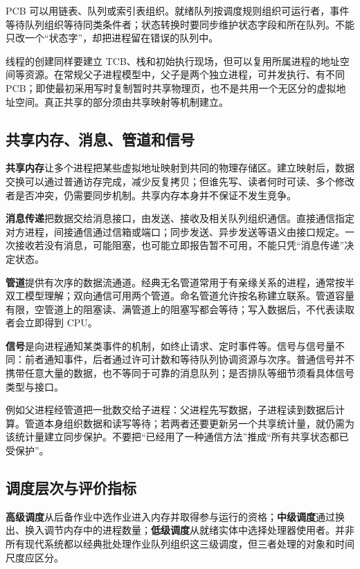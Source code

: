 PCB 可以用链表、队列或索引表组织。就绪队列按调度规则组织可运行者，事件等待队列组织等待同类条件者；状态转换时要同步维护状态字段和所在队列。不能只改一个``状态字''，却把进程留在错误的队列中。

线程的创建同样要建立 TCB、栈和初始执行现场，但可以复用所属进程的地址空间等资源。在常规父子进程模型中，父子是两个独立进程，可并发执行、有不同 PCB；即使最初采用写时复制暂时共享物理页，也不是共用一个无区分的虚拟地址空间。真正共享的部分须由共享映射等机制建立。

\subsection{共享内存、消息、管道和信号}\label{OS02-2-5}

\textbf{共享内存}让多个进程把某些虚拟地址映射到共同的物理存储区。建立映射后，数据交换可以通过普通访存完成，减少反复拷贝；但谁先写、读者何时可读、多个修改者是否冲突，仍需要同步机制。共享内存本身并不保证不发生竞争。

\textbf{消息传递}把数据交给消息接口，由发送、接收及相关队列组织通信。直接通信指定对方进程，间接通信通过信箱或端口；同步发送、异步发送等语义由接口规定。一次接收若没有消息，可能阻塞，也可能立即报告暂不可用，不能只凭``消息传递''决定状态。

\textbf{管道}提供有次序的数据流通道。经典无名管道常用于有亲缘关系的进程，通常按半双工模型理解；双向通信可用两个管道。命名管道允许按名称建立联系。管道容量有限，空管道上的阻塞读、满管道上的阻塞写都会等待；写入数据后，不代表读取者会立即得到 CPU。

\textbf{信号}是向进程通知某类事件的机制，如终止请求、定时事件等。信号与信号量不同：前者通知事件，后者通过许可计数和等待队列协调资源与次序。普通信号并不携带任意大量的数据，也不等同于可靠的消息队列；是否排队等细节须看具体信号类型与接口。

例如父进程经管道把一批数交给子进程：父进程先写数据，子进程读到数据后计算。管道本身组织数据和读写等待；若两者还要更新另一个共享统计量，就仍需为该统计量建立同步保护。不要把``已经用了一种通信方法''推成``所有共享状态都已受保护''。

\subsection{调度层次与评价指标}\label{OS02-2-6}

\textbf{高级调度}从后备作业中选作业进入内存并取得参与运行的资格；\textbf{中级调度}通过换出、换入调节内存中的进程数量；\textbf{低级调度}从就绪实体中选择处理器使用者。并非所有现代系统都以经典批处理作业队列组织这三级调度，但三者处理的对象和时间尺度应区分。

